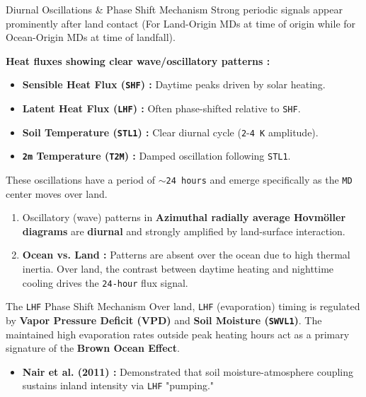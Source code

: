 \documentclass[8pt, aspectratio=169]{beamer}
\begin{document}
\begin{frame}{Diurnal Oscillations \& Phase Shift Mechanism}
    Strong periodic signals appear prominently after land contact (For Land-Origin MDs at time of origin while for Ocean-Origin MDs at time of landfall).

    \vspace{0.2cm}
    \footnotesize
    \textbf{Heat fluxes showing clear wave/oscillatory patterns :}
    \begin{itemize}
        \item \textbf{Sensible Heat Flux (\texttt{SHF}) :} Daytime peaks driven by solar heating.
        \item \textbf{Latent Heat Flux (\texttt{LHF}) :} Often phase-shifted relative to \texttt{SHF}.
        \item \textbf{Soil Temperature (\texttt{STL1}) :} Clear diurnal cycle (\texttt{2}-\texttt{4 K} amplitude).
        \item \textbf{\texttt{2m} Temperature (\texttt{T2M}) :} Damped oscillation following \texttt{STL1}.
    \end{itemize}

    \vspace{0.2cm}
    \footnotesize
    These oscillations have a period of \texttt{$\sim$24 hours} and emerge specifically as the \texttt{MD} center moves over land.
    \begin{enumerate}
        \item Oscillatory (wave) patterns in \textbf{Azimuthal radially average Hovm\"oller diagrams} are \textbf{diurnal} and strongly amplified by land-surface interaction.
        \item \textbf{Ocean vs. Land :} Patterns are absent over the ocean due to high thermal inertia. Over land, the contrast between daytime heating and nighttime cooling drives the \texttt{24-hour} flux signal.
    \end{enumerate}

    \begin{block}{The \texttt{LHF} Phase Shift Mechanism}
        Over land, \texttt{LHF} (evaporation) timing is regulated by \textbf{Vapor Pressure Deficit (VPD)} and \textbf{Soil Moisture (\texttt{SWVL1})}. The maintained high evaporation rates outside peak heating hours act as a primary signature of the \textbf{Brown Ocean Effect}. \cite{nair2011influence}
    \end{block}

    \vfill
    \noindent\makebox[\linewidth]{\rule{\paperwidth}{0.4pt}}
    \vspace{-0.2cm}
    \tiny
    \begin{itemize}
        \item \textbf{Nair et al. (2011) \cite{nair2011influence} :} Demonstrated that soil moisture-atmosphere coupling sustains inland intensity via \texttt{LHF} "pumping."
    \end{itemize}
\end{frame}
\end{document}
